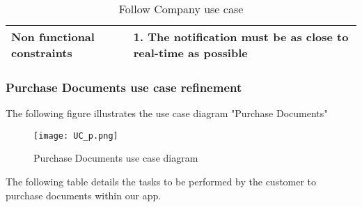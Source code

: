 \begin{table}[H]
\begin{tabular}{|ll|}
\multicolumn{1}{|l|}{\textbf{Non functional constraints}} & 1. The notification must be as close to real-time as possible                                                                                                                                                                                                                                                                                                                                                                                  \\ \hline
\end{tabular}
\caption{Follow Company use case}
\end{table}
\pagebreak
\subsubsection{Purchase Documents use case refinement}
The following figure illustrates the use case diagram "Purchase Documents"
\begin{figure}[H]%
    \center   
    \texttt{[image: UC\_p.png]}
    \caption{Purchase Documents use case diagram}
\end{figure}
\pagebreak
The following table details the tasks to be performed by the customer to purchase documents within our app.

